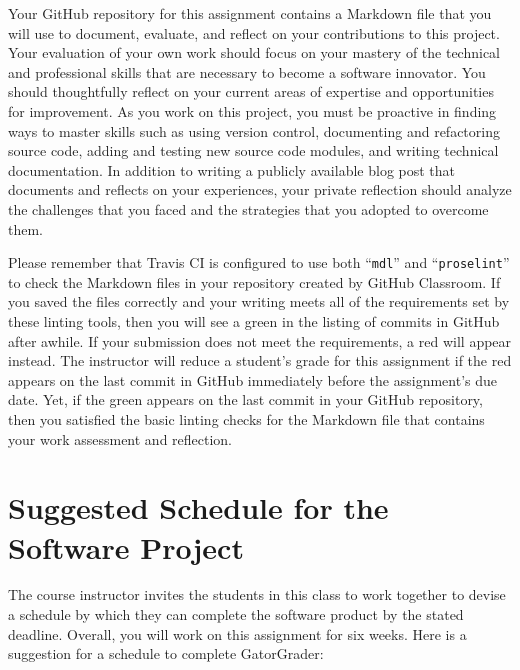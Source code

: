 \documentclass[11pt]{article}
\newcommand{\command}[1]{``\lstinline{#1}''}
\newcommand{\checkmark}{\ding{51}}
\newcommand{\naughtmark}{\ding{55}}
\begin{document}
Your GitHub repository for this assignment contains a Markdown file that you
will use to document, evaluate, and reflect on your contributions to this
project.
%
Your evaluation of your own work should focus on your mastery of the technical
and professional skills that are necessary to become a software innovator. You
should thoughtfully reflect on your current areas of expertise and opportunities
for improvement. As you work on this project, you must be proactive in finding
ways to master skills such as using version control, documenting and refactoring
source code, adding and testing new source code modules, and writing technical
documentation. In addition to writing a publicly available blog post that
documents and reflects on your experiences, your private reflection should
analyze the challenges that you faced and the strategies that you adopted to
overcome them.


Please remember that Travis CI is configured to use both \command{mdl} and
\command{proselint} to check the Markdown files in your repository created by
GitHub Classroom.
%
If you saved the files correctly and your writing meets all of the requirements
set by these linting tools, then you will see a green \checkmark{} in the
listing of commits in GitHub after awhile. If your submission does not meet the
requirements, a red \naughtmark{} will appear instead. The instructor will
reduce a student's grade for this assignment if the red \naughtmark{} appears on
the last commit in GitHub immediately before the assignment's due date. Yet, if
the green \checkmark{} appears on the last commit in your GitHub repository,
then you satisfied the basic linting checks for the Markdown file that contains
your work assessment and reflection.

\section*{Suggested Schedule for the Software Project}

The course instructor invites the students in this class to work together to
devise a schedule by which they can complete the software product by the stated
deadline. Overall, you will work on this assignment for six weeks. Here is a
suggestion for a schedule to complete GatorGrader:
\end{document}
